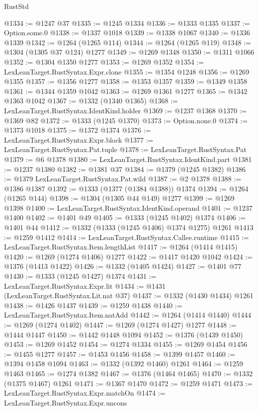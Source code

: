 \begin{lexlean}{RustStd}
\begin{coremodule}
@1334 := @1247 @37
@1335 := @1245 @1334
@1336 := @1333 @1335
@1337 := Option.some.{0}
@1338 := @1337 @1018
@1339 := @1338 @1067
@1340 := @1336 @1339
@1342 := @1264 (@1265 @114)
@1344 := @1264 (@1265 @119)
@1348 := @1304 (@1305 @37 @124) @1277
@1349 := @1269 @1348
@1350 := @1311 @1066
@1352 := @1304 @1350 @1277
@1353 := @1269 @1352
@1354 := LexLeanTarget.RustSyntax.Expr.clone
@1355 := @1354 @1248
@1356 := @1269 @1355
@1357 := @1356 @1277
@1358 := @1353 @1357
@1359 := @1349 @1358
@1361 := @1344 @1359 @1042
@1363 := @1269 @1361 @1277
@1365 := @1342 @1363 @1042
@1367 := @1332 (@1340 @1365)
@1368 := LexLeanTarget.RustSyntax.IdentKind.holder
@1369 := @1237 @1368
@1370 := @1369 @82
@1372 := @1333 (@1245 @1370)
@1373 := Option.none.{0}
@1374 := @1373 @1018
@1375 := @1372 @1374
@1376 := LexLeanTarget.RustSyntax.Expr.block
@1377 := LexLeanTarget.RustSyntax.Pat.tuple
@1378 := LexLeanTarget.RustSyntax.Pat
@1379 := @6 @1378
@1380 := LexLeanTarget.RustSyntax.IdentKind.part
@1381 := @1237 @1380
@1382 := @1381 @37
@1384 := @1379 (@1245 @1382)
@1386 := @1379 LexLeanTarget.RustSyntax.Pat.wild
@1387 := @2 @1378
@1388 := @1386 @1387
@1392 := @1333 (@1377 (@1384 @1388)) @1374
@1394 := @1264 (@1265 @144)
@1398 := @1304 (@1305 @44 @149) @1277
@1399 := @1269 @1398
@1400 := LexLeanTarget.RustSyntax.IdentKind.operand
@1401 := @1237 @1400
@1402 := @1401 @49
@1405 := @1333 (@1245 @1402) @1374
@1406 := @1401 @44
@1412 := @1332 (@1333 (@1245 @1406) @1374 @1275) @1261
@1413 := @1259 @1412
@1414 := LexLeanTarget.RustSyntax.Callee.runtime
@1415 := LexLeanTarget.RustSyntax.Item.lengthList
@1417 := @1264 (@1414 @1415)
@1420 := @1269 (@1274 @1406) @1277
@1422 := @1417 @1420 @1042
@1424 := @1376 (@1413 @1422)
@1426 := @1332 (@1405 @1424)
@1427 := @1401 @77
@1430 := @1333 (@1245 @1427) @1374
@1431 := LexLeanTarget.RustSyntax.Expr.lit
@1434 := @1431 (LexLeanTarget.RustSyntax.Lit.nat @37)
@1437 := @1332 (@1430 @1434) @1261
@1438 := @1426 @1437
@1439 := @1259 @1438
@1440 := LexLeanTarget.RustSyntax.Item.natAdd
@1442 := @1264 (@1414 @1440)
@1444 := @1269 (@1274 @1402)
@1447 := @1269 (@1274 @1427) @1277
@1448 := @1444 @1447
@1450 := @1442 @1448 @1094
@1452 := @1376 (@1439 @1450)
@1453 := @1269 @1452
@1454 := @1274 @1334
@1455 := @1269 @1454
@1456 := @1455 @1277
@1457 := @1453 @1456
@1458 := @1399 @1457
@1460 := @1394 @1458 @1094
@1463 := @1332 (@1392 @1460) @1261
@1464 := @1259 @1463
@1465 := @1274 @1382
@1467 := @1376 (@1464 @1465)
@1470 := @1332 (@1375 @1467) @1261
@1471 := @1367 @1470
@1472 := @1259 @1471
@1473 := LexLeanTarget.RustSyntax.Expr.matchOn
@1474 := LexLeanTarget.RustSyntax.Expr.uncons

\end{coremodule}
\end{lexlean}
